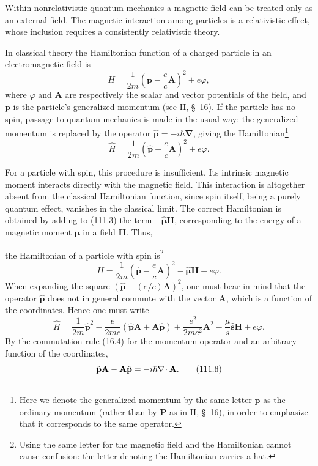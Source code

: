 Within nonrelativistic quantum mechanics a magnetic field can be treated only as an external field. The magnetic interaction among particles is a relativistic effect, whose inclusion requires a consistently relativistic theory.

In classical theory the Hamiltonian function of a charged particle in an electromagnetic field is
\[
 H=\frac{1}{2m}\left(\mathbf p-\frac ec\mathbf A\right)^2+e\varphi,
\]
where $\varphi$ and $\mathbf A$ are respectively the scalar and vector potentials of the field, and $\mathbf p$ is the particle's generalized momentum (see II, \S~16). If the particle has no spin, passage to quantum mechanics is made in the usual way: the generalized momentum is replaced by the operator $\hat{\mathbf p}=-i\hbar\boldsymbol\nabla$, giving the Hamiltonian\footnote{Here we denote the generalized momentum by the same letter $\mathbf p$ as the ordinary momentum (rather than by $\mathbf P$ as in II, \S~16), in order to emphasize that it corresponds to the same operator.}
\begin{equation}
 \hat H=\frac{1}{2m}\left(\hat{\mathbf p}-\frac ec\mathbf A\right)^2+e\varphi.
 \tag{111.3}
\end{equation}

For a particle with spin, this procedure is insufficient. Its intrinsic magnetic moment interacts directly with the magnetic field. This interaction is altogether absent from the classical Hamiltonian function, since spin itself, being a purely quantum effect, vanishes in the classical limit. The correct Hamiltonian is obtained by adding to (111.3) the term $-\hat{\boldsymbol\mu}\mathbf H$, corresponding to the energy of a magnetic moment $\boldsymbol\mu$ in a field $\mathbf H$. Thus,

the Hamiltonian of a particle with spin is\footnote{Using the same letter for the magnetic field and the Hamiltonian cannot cause confusion: the letter denoting the Hamiltonian carries a hat.}
\begin{equation}
 \hat H=\frac{1}{2m}\left(\hat{\mathbf p}-\frac ec\mathbf A\right)^2-\hat{\boldsymbol\mu}\mathbf H+e\varphi.
 \tag{111.4}
\end{equation}
When expanding the square $(\hat{\mathbf p}-(e/c)\mathbf A)^2$, one must bear in mind that the operator $\hat{\mathbf p}$ does not in general commute with the vector $\mathbf A$, which is a function of the coordinates. Hence one must write
\begin{equation}
 \hat H=\frac{1}{2m}\hat{\mathbf p}^{2}-\frac{e}{2mc}(\hat{\mathbf p}\mathbf A+\mathbf A\hat{\mathbf p})+\frac{e^2}{2mc^2}\mathbf A^2-\frac{\mu}{s}\hat{\mathbf s}\mathbf H+e\varphi.
 \tag{111.5}
\end{equation}
By the commutation rule (16.4) for the momentum operator and an arbitrary function of the coordinates,
\begin{equation}
 \hat{\mathbf p}\mathbf A-\mathbf A\hat{\mathbf p}=-i\hbar\nabla\!\cdot \mathbf A.
 \tag{111.6}
\end{equation}

